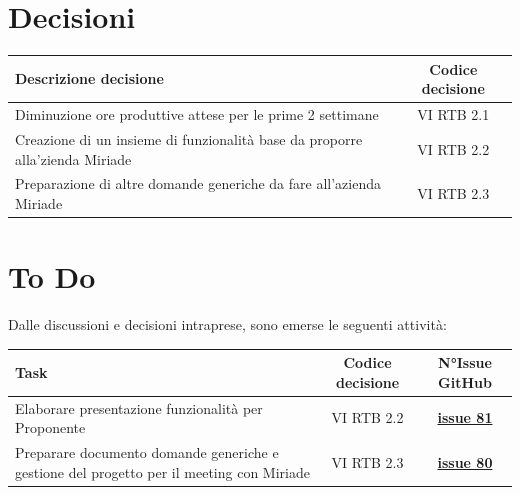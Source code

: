 \documentclass[a4paper,12pt]{article}
\newcommand{\ignoreglossary}{}
\begin{document}
\section{Decisioni}
\begin{center}
\small
\renewcommand{\arraystretch}{1.2} 
\begin{tabular}{|p{}|c|}
\hline
\rowcolor{gray!60} 
\textbf{Descrizione decisione} & \textbf{Codice decisione} \\
\hline
\rowcolor{white}
Diminuzione ore produttive attese per le prime 2 settimane & VI \ignoreglossary{RTB} 2.1 \\
\hline
\rowcolor{gray!20}
Creazione di un insieme di funzionalità base da proporre alla'zienda Miriade & VI \ignoreglossary{RTB} 2.2 \\
\hline
\rowcolor{white}
Preparazione di altre domande generiche da fare all'azienda Miriade & VI \ignoreglossary{RTB} 2.3 \\
\hline
\end{tabular}
\end{center}

\section{To Do}
Dalle discussioni e decisioni intraprese, sono emerse le seguenti attività:

\begin{center}
\small
\renewcommand{\arraystretch}{1.2} 
\begin{tabular}{|p{}|c|c|}
\hline
\rowcolor{gray!60} 
\textbf{Task} & \textbf{Codice decisione} & \textbf{N°Issue GitHub} \\
\hline
\rowcolor{white}
Elaborare presentazione funzionalità per Proponente & VI \ignoreglossary{RTB} 2.2 & \href{https://github.com/SWE-BitByBit/SWE-project/issues/81}{\textbf{issue 81}} \\
\hline
\rowcolor{gray!20}
Preparare documento domande generiche e gestione del progetto per il meeting con Miriade & VI \ignoreglossary{RTB} 2.3 & \href{https://github.com/SWE-BitByBit/SWE-project/issues/80}{\textbf{issue 80}} \\
\hline
\end{tabular}
\end{center}
\end{document}
